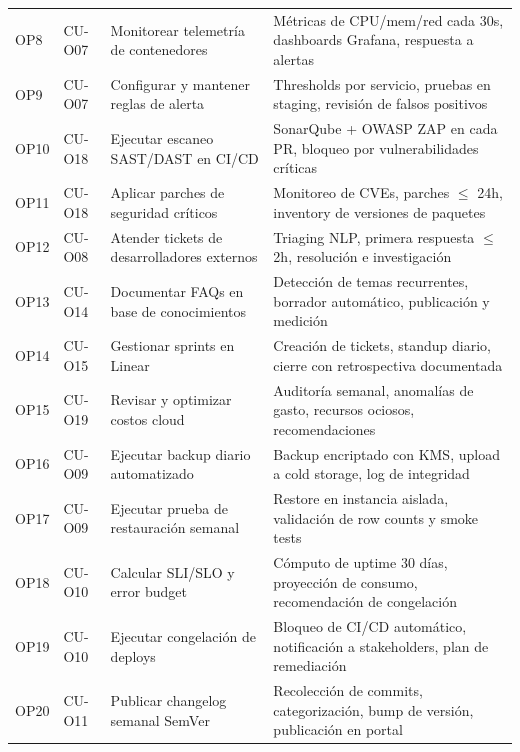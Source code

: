 ﻿\documentclass[11pt, letterpaper]{article}
\begin{document}
\begin{longtable}{>{\raggedright\arraybackslash}p{0.8cm} >{\raggedright\arraybackslash}p{2.2cm} >{\raggedright\arraybackslash}p{7.8cm} >{\raggedright\arraybackslash}p{4.8cm}}
OP8 & CU-O07 & Monitorear telemetría de contenedores & Métricas de CPU/mem/red cada 30s, dashboards Grafana, respuesta a alertas \\

OP9 & CU-O07 & Configurar y mantener reglas de alerta & Thresholds por servicio, pruebas en staging, revisión de falsos positivos \\

OP10 & CU-O18 & Ejecutar escaneo SAST/DAST en CI/CD & SonarQube + OWASP ZAP en cada PR, bloqueo por vulnerabilidades críticas \\

OP11 & CU-O18 & Aplicar parches de seguridad críticos & Monitoreo de CVEs, parches $\le$ 24h, inventory de versiones de paquetes \\

OP12 & CU-O08 & Atender tickets de desarrolladores externos & Triaging NLP, primera respuesta $\le$ 2h, resolución e investigación \\

OP13 & CU-O14 & Documentar FAQs en base de conocimientos & Detección de temas recurrentes, borrador automático, publicación y medición \\

OP14 & CU-O15 & Gestionar sprints en Linear & Creación de tickets, standup diario, cierre con retrospectiva documentada \\

OP15 & CU-O19 & Revisar y optimizar costos cloud & Auditoría semanal, anomalías de gasto, recursos ociosos, recomendaciones \\

OP16 & CU-O09 & Ejecutar backup diario automatizado & Backup encriptado con KMS, upload a cold storage, log de integridad \\

OP17 & CU-O09 & Ejecutar prueba de restauración semanal & Restore en instancia aislada, validación de row counts y smoke tests \\

OP18 & CU-O10 & Calcular SLI/SLO y error budget & Cómputo de uptime 30 días, proyección de consumo, recomendación de congelación \\

OP19 & CU-O10 & Ejecutar congelación de deploys & Bloqueo de CI/CD automático, notificación a stakeholders, plan de remediación \\

OP20 & CU-O11 & Publicar changelog semanal SemVer & Recolección de commits, categorización, bump de versión, publicación en portal \\


\end{longtable}
\end{document}

